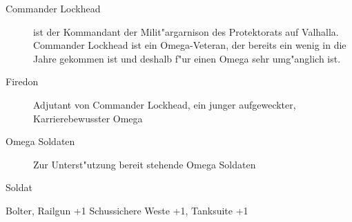 
\begin{description}
    \item[Commander Lockhead] ist der Kommandant der Milit"argarnison des Protektorats auf Valhalla. Commander Lockhead ist ein 
        Omega-Veteran, der bereits ein wenig in die Jahre gekommen ist und deshalb f"ur einen Omega sehr umg"anglich ist. 
    \item[Firedon] Adjutant von Commander Lockhead, ein junger aufgeweckter, Karrierebewusster Omega
    \item[Omega Soldaten] Zur Unterst"utzung bereit stehende Omega Soldaten
\end{description}

\begin{nscsheet}{Soldat}
    \nscstats[ATT=3,AGG=2,CON=2]
    \nscruler
    \begin{nscinventory}
        \nscitem[Waffen] Bolter, Railgun +1
        \nscitem[R"ustung] Schussichere Weste +1, Tanksuite +1
    \end{nscinventory}
\end{nscsheet}
